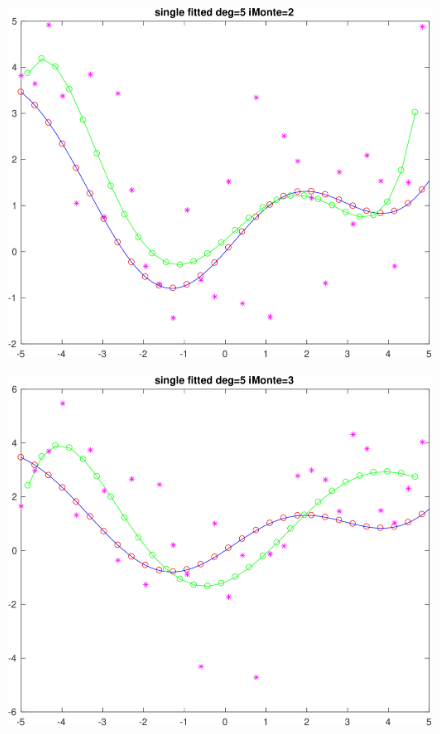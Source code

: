 \documentclass[11pt]{article}
\begin{document}
 \begin{figure}[h!]
\centering\includegraphics[scale=0.1]{single_poly_d_5_iMonte_2.png}
\end{figure}

\begin{figure}[h!]
\centering\includegraphics[scale=0.1]{single_poly_d_5_iMonte_3.png}
\end{figure}
\end{document}

